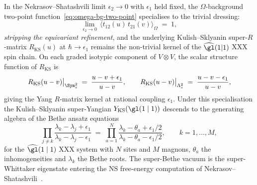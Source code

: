 \begin{theorem}
\label{thm:ns-limit-xxx}
In the Nekrasov--Shatashvili limit $\epsilon_2 \to 0$ with $\epsilon_1$
held fixed, the $\Omega$-background two-point
function~\eqref{eq:omega-bg-two-point} specialises to the trivial
dressing:
\begin{equation}\label{eq:ns-two-point-trivial}
 \lim_{\epsilon_2 \to 0}\,
 \langle t_{12}(u)\, t_{21}(v) \rangle_\Omega
 \;=\; 1,
\end{equation}
\emph{stripping the equivariant refinement}, and the underlying
Kulish--Sklyanin super-$R$-matrix $R_{\mathrm{KS}}(u)$ at
$\hbar \to \epsilon_1$ remains the non-trivial kernel of the
$\widehat{\gl}(1|1)$ XXX spin chain. On each graded isotypic
component of $V \otimes V$, the scalar structure function of
$R_{\mathrm{KS}}$ is
\begin{equation}\label{eq:ns-two-point-isotypic}
 R_{\mathrm{KS}}(u - v)\big|_{\Sym^2_s}
 \;=\; \frac{u - v + \epsilon_1}{u - v},
 \qquad
 R_{\mathrm{KS}}(u - v)\big|_{\Lambda^2_s}
 \;=\; \frac{u - v - \epsilon_1}{u - v},
\end{equation}
giving the Yang $R$-matrix kernel at rational coupling
$\epsilon_1$. Under this specialisation the Kulish--Sklyanin
super-Yangian $Y_{\mathrm{KS}}(\gl(1 \mid 1))$ descends to the
generating algebra of the Bethe ansatz equations
\[
 \prod_{j \neq k}
 \frac{\lambda_k - \lambda_j + \epsilon_1}{\lambda_k - \lambda_j - \epsilon_1}
 \;=\; \prod_{a = 1}^{N}
 \frac{\lambda_k - \theta_a + \epsilon_1/2}{\lambda_k - \theta_a - \epsilon_1/2},
 \qquad k = 1, \ldots, M,
\]
for the $\widehat{\gl}(1 \mid 1)$ XXX system with $N$ sites and
$M$ magnons, $\theta_a$ the inhomogeneities and $\lambda_k$ the
Bethe roots. The super-Bethe vacuum is the super-Whittaker
eigenstate entering the NS free-energy computation of
Nekrasov--Shatashvili~\cite{NekrasovShatashvili2009}.
\end{theorem}

